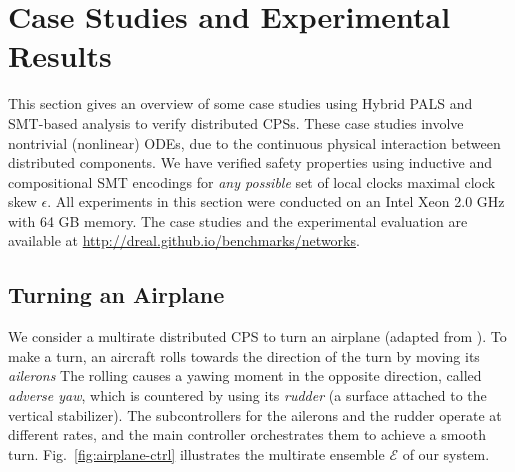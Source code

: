 
%
\section{Case Studies and Experimental Results}
\label{sec:case-studies}

This section gives an overview of some 
case studies using Hybrid PALS and SMT-based analysis to verify %
distributed CPSs. 
%
These case studies involve nontrivial (nonlinear) ODEs,
due to the  continuous physical interaction between distributed components.
We have verified safety properties 
using %
inductive and compositional SMT encodings
for \emph{any possible} set of  local clocks  maximal clock skew $\epsilon$.
%
All  experiments in this section
were conducted on an Intel Xeon 2.0 GHz with 64 GB memory.
The case studies and the experimental evaluation are available at %
\url{http://dreal.github.io/benchmarks/networks}. 




\subsection{Turning an Airplane}
\label{sec:ex-airplane}

We consider a multirate distributed CPS
to turn an airplane (adapted from \cite{ftscs-journal}).
%
To make a turn, an aircraft rolls towards the direction of the turn
by moving its \emph{ailerons} %
The rolling causes 
a yawing moment in the opposite direction, called \emph{adverse yaw},
which is countered by using its \emph{rudder} (a surface attached to the vertical stabilizer).
%
The subcontrollers for the ailerons and the rudder operate at different rates, 
and the main controller orchestrates them to achieve a smooth turn.
%
Fig.~\ref{fig:airplane-ctrl} illustrates the multirate ensemble $\mathcal{E}$ of our system.


